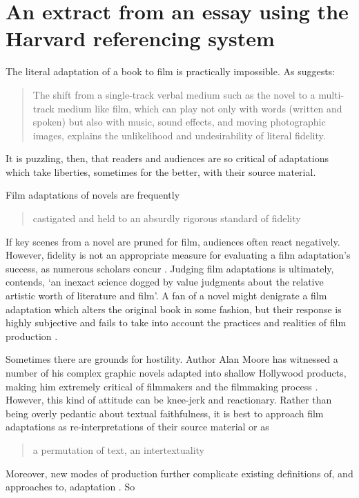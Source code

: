 \chapter{An extract from an essay using the Harvard referencing system}
\begin{refsection}
\textelp{} The literal adaptation of a book to film is practically impossible. As \textcite[4]{Stam2005} suggests:
\blockquote{The shift from a single-track verbal medium such as the novel to a multi-track medium like film, which can play not only with words (written and spoken) but also with music, sound effects, and moving photographic images, explains the unlikelihood and \textelp{} undesirability of literal fidelity.}
It is puzzling, then, that readers and audiences are so critical of adaptations which take liberties, sometimes for the better, with their source material.

Film adaptations of novels are frequently 
\blockquote[{\parencite[15]{Stam2005a}}]{castigated and held to an absurdly rigorous standard of fidelity}. 
If key scenes from a novel are pruned for film, audiences often react negatively. However, fidelity is not an appropriate measure for evaluating a film adaptation’s success, as numerous scholars concur \parencite{Desmond2006,Leitch2008,McFarlane1996,Miller2004}. Judging film adaptations is ultimately, \textcite[9]{Whelehan1999} contends, ‘an inexact science dogged by value judgments about the relative artistic worth of literature and film’. A fan of a novel might denigrate a film adaptation which alters the original book in some fashion, but their response is highly subjective and fails to take into account the practices and realities of film production \parencite[26]{McFarlane2007}.

Sometimes there are grounds for hostility. Author Alan Moore has witnessed a number of his complex graphic novels adapted into shallow Hollywood products, making him extremely critical of filmmakers and the filmmaking process \parencite{Ahsurst2009}. However, this kind of attitude can be knee-jerk and reactionary. Rather than being overly pedantic about textual faithfulness, it is best to approach film adaptations as re-interpretations of their source material \parencite[8]{Hutcheon2006} or as 
\blockquote[{\parencite[Kristeva, cited in][2]{Sanders2006}}]{a permutation of text, an intertextuality}. %
Moreover, new modes of production further complicate existing definitions of, and approaches to, adaptation \parencite[180]{Moore2010}. So\textelp{}
\pagebreak[3]
\printbibliography[heading=subbibliography]
\end{refsection}